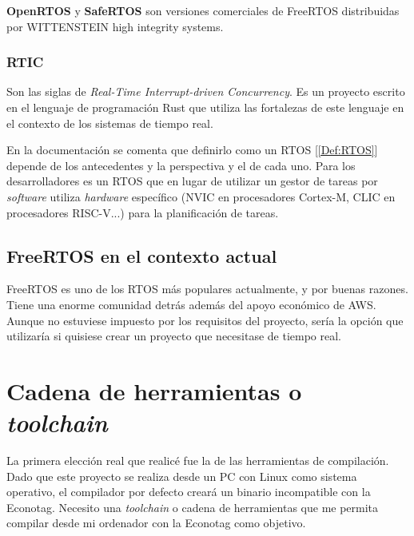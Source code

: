 \textbf{OpenRTOS} y \textbf{SafeRTOS} son versiones comerciales de FreeRTOS distribuidas por WITTENSTEIN high integrity systems.

\subsubsection{RTIC}
Son las siglas de \emph{Real-Time Interrupt-driven Concurrency}. Es un proyecto escrito en el lenguaje de programación Rust que utiliza las fortalezas de este lenguaje en el contexto de los sistemas de tiempo real.

En la documentación \cite{RTIC} se comenta que definirlo como un RTOS [\ref{Def:RTOS}] depende de los antecedentes y la perspectiva y el de cada uno. Para los desarrolladores es un RTOS que en lugar de utilizar un gestor de tareas por \emph{software} utiliza \emph{hardware} específico (NVIC en procesadores Cortex-M, CLIC en procesadores RISC-V...) para la planificación de tareas.

\subsection{FreeRTOS en el contexto actual}
FreeRTOS es uno de los RTOS más populares actualmente, y por buenas razones. Tiene una enorme comunidad detrás además del apoyo económico de AWS. Aunque no estuviese impuesto por los requisitos del proyecto, sería la opción que utilizaría si quisiese crear un proyecto que necesitase de tiempo real.

\section{Cadena de herramientas o \emph{toolchain}}
La primera elección real que realicé fue la de las herramientas de compilación. Dado que este proyecto se realiza desde un PC con Linux como sistema operativo, el compilador por defecto creará un binario incompatible con la Econotag. Necesito una \emph{toolchain} o cadena de herramientas que me permita compilar desde mi ordenador con la Econotag como objetivo.

%

